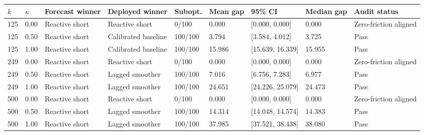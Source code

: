 \begin{tabular}{lllllllll}
\toprule
\(k\) & \(\kappa\) & Forecast winner & Deployed winner & Subopt. & Mean gap & 95\% CI & Median gap & Audit status \\
\midrule
125 & 0.00 & Reactive short & Reactive short & 0/100 & 0.000 & [0.000, 0.000] & 0.000 & Zero-friction aligned \\
125 & 0.50 & Reactive short & Calibrated baseline & 100/100 & 3.794 & [3.584, 4.012] & 3.725 & Pass \\
125 & 1.00 & Reactive short & Calibrated baseline & 100/100 & 15.986 & [15.639, 16.339] & 15.955 & Pass \\
249 & 0.00 & Reactive short & Reactive short & 0/100 & 0.000 & [0.000, 0.000] & 0.000 & Zero-friction aligned \\
249 & 0.50 & Reactive short & Lagged smoother & 100/100 & 7.016 & [6.756, 7.283] & 6.977 & Pass \\
249 & 1.00 & Reactive short & Lagged smoother & 100/100 & 24.651 & [24.226, 25.079] & 24.473 & Pass \\
500 & 0.00 & Reactive short & Reactive short & 0/100 & 0.000 & [0.000, 0.000] & 0.000 & Zero-friction aligned \\
500 & 0.50 & Reactive short & Lagged smoother & 100/100 & 14.314 & [14.048, 14.574] & 14.383 & Pass \\
500 & 1.00 & Reactive short & Lagged smoother & 100/100 & 37.985 & [37.521, 38.438] & 38.080 & Pass \\
\bottomrule
\end{tabular}
